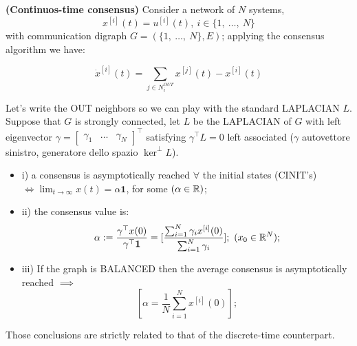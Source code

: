 \begin{thrm}{\textbf{(Continuos-time consensus)}} \newline
Consider a network of $N$ systems,
\[
	x^{[i]}(t) = u^{[i]}(t),\ i\in\{1,\ \dots,\ N\}
\]
with communication digraph $G=(\{1,\ \dots,\ N\},E)$; applying the consensus algorithm we have:

\[
	\dot{x}^{[i]}(t) = \sum_{j\in N_i^{OUT}}{x^{[j]}(t) - x^{[i]}(t)}
\]

Let's write the OUT neighbors so we can play with the standard LAPLACIAN $L$. Suppose that $G$ is strongly connected, let $L$ be the LAPLACIAN of $G$ with left eigenvector $\gamma = \begin{bmatrix}\gamma_1&\dots &\gamma_N\end{bmatrix}^\top$ satisfying $\gamma^\top L = 0$ left associated ($\gamma$ autovettore sinistro, generatore dello spazio $\ker^{\perp}{L}$).
\begin{itemize}
\item{i)} a consensus is asymptotically reached $\forall$ the initial states (CINIT's) $\iff \lim_{t\to\infty}{x(t)} = \alpha\mathbf{1}$, for some $(\alpha\in\mathbb{R})$;
\item{ii)} the consensus value is:
\[
	\alpha := \frac{\gamma^\top x(0)}{\gamma^\top \mathbf{1}} = [\frac{\sum_{i=1}^N{\gamma_i x^{[i]}(0)}}{\sum_{i=1}^N{\gamma_i}}];\ (x_0\in\mathbb{R}^N);
\]
\item{iii)} If the graph is BALANCED then the average consensus is asymptotically reached $\implies$
\[
	[\alpha = \frac{1}{N}\sum_{i=1}^N{x^{[i]}(0)}];
\]
\end{itemize}
\end{thrm}

Those conclusions are strictly related to that of the discrete-time counterpart.

